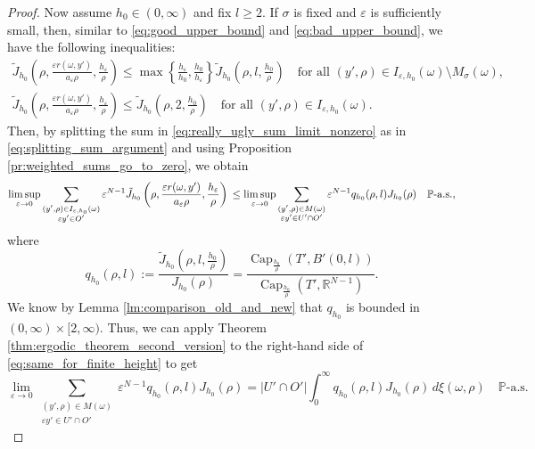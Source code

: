 \documentclass{article}
\numberwithin{equation}{section}
\theoremstyle{definition}
\theoremstyle{remark}
\newcommand{\cpct}{\operatorname{Cap}}
\begin{document}
\begin{proof}
    Now assume $h_0 \in (0, \infty)$ and fix $l \ge 2$. If $\sigma$ is fixed and $\varepsilon$ is sufficiently small, then, similar to \eqref{eq:good_upper_bound} and \eqref{eq:bad_upper_bound}, we have the following inequalities:
    \begin{gather*}
        \tilde{J}_{h_0}\left(\rho, \frac{\varepsilon r(\omega, y')}{a_\varepsilon \rho}, \frac{h_\varepsilon}{\rho}\right) \le \max\left\{\frac{h_\varepsilon}{h_0}, \frac{h_0}{h_\varepsilon}\right\} \tilde{J}_{h_0}\left(\rho, l, \frac{h_0}{\rho}\right) \quad \text{for all } (y', \rho) \in I_{\varepsilon, h_0}(\omega) \setminus M_\sigma(\omega), \\
        \tilde{J}_{h_0}\left(\rho, \frac{\varepsilon r(\omega, y')}{a_\varepsilon \rho}, \frac{h_\varepsilon}{\rho}\right) \le \tilde{J}_{h_0}\left(\rho, 2 , \frac{h_0}{\rho}\right) \quad \text{for all } (y', \rho) \in I_{\varepsilon, h_0}(\omega).
    \end{gather*}
    Then, by splitting the sum in \eqref{eq:really_ugly_sum_limit_nonzero} as in \eqref{eq:splitting_sum_argument} and using Proposition \ref{pr:weighted_sums_go_to_zero}, we obtain    
    \begin{equation} \label{eq:same_for_finite_height}
        \limsup_{\varepsilon \to 0}\sum \limits_{\substack{(y', \rho) \in I_{\varepsilon, h_0}(\omega) \\ \varepsilon y' \in O'}} \varepsilon^{N - 1} \tilde{J}_{h_0}\left(\rho, \frac{\varepsilon r(\omega, y')}{a_\varepsilon \rho}, \frac{h_\varepsilon}{\rho}\right)  \\
        \le \limsup_{\varepsilon \to 0} \sum \limits_{\substack{(y', \rho) \in M(\omega) \\ \varepsilon y' \in U' \cap O'}} \varepsilon^{N - 1} q_{h_0}(\rho, l) J_{h_0}(\rho) \quad \mathbb{P}\text{-a.s.},
    \end{equation}
    where
    \[
    q_{h_0}(\rho, l) := \frac{\tilde{J}_{h_0}\left(\rho, l, \frac{h_0}{\rho}\right)}{J_{h_0}(\rho)} = \frac{\cpct_{\frac{h_0}{\rho}}(T', B'(0, l))}{\cpct_{\frac{h_0}{\rho}}(T', \mathbb{R}^{N - 1})}.
    \]
    We know by Lemma \ref{lm:comparison_old_and_new} that $q_{h_0}$ is bounded in $(0, \infty) \times [2, \infty)$. Thus, we can apply Theorem \ref{thm:ergodic_theorem_second_version} to the right-hand side of \eqref{eq:same_for_finite_height} to get
    \[
    \lim_{\varepsilon \to 0} \sum \limits_{\substack{(y', \rho) \in M(\omega) \\ \varepsilon y' \in U' \cap O'}} \varepsilon^{N - 1} q_{h_0}(\rho, l) J_{h_0}(\rho) = |U' \cap O'| \int_0^\infty q_{h_0}(\rho, l) J_{h_0}(\rho) \, d\xi(\omega, \rho) \quad \mathbb{P}\text{-a.s.}
\]
\end{proof}
\end{document}
